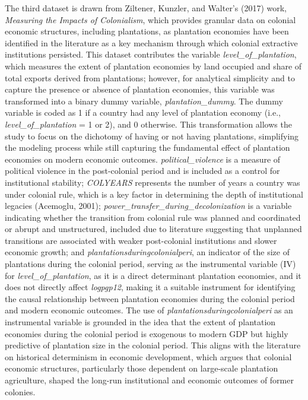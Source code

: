 \documentclass[12pt]{article}
\begin{document}
\vspace{0.2 in} 
\noindent The third dataset is drawn from Ziltener, Kunzler, and Walter’s (2017) work, \textit{Measuring the Impacts of Colonialism}, which provides granular data on colonial economic structures, including plantations, as plantation economies have been identified in the literature as a key mechanism through which colonial extractive institutions persisted. This dataset contributes the variable \textit{level\_of\_plantation}, which measures the extent of plantation economies by land occupied and share of total exports derived from plantations; however, for analytical simplicity and to capture the presence or absence of plantation economies, this variable was transformed into a binary dummy variable, \textit{plantation\_dummy}. The dummy variable is coded as 1 if a country had any level of plantation economy (i.e., \textit{level\_of\_plantation} = 1 or 2), and 0 otherwise. This transformation allows the study to focus on the dichotomy of having or not having plantations, simplifying the modeling process while still capturing the fundamental effect of plantation economies on modern economic outcomes. \textit{political\_violence} is a measure of political violence in the post-colonial period and is included as a control for institutional stability; \textit{COLYEARS} represents the number of years a country was under colonial rule, which is a key factor in determining the depth of institutional legacies (Acemoglu, 2001); \textit{power\_transfer\_during\_decolonization} is a variable indicating whether the transition from colonial rule was planned and coordinated or abrupt and unstructured, included due to literature suggesting that unplanned transitions are associated with weaker post-colonial institutions and slower economic growth; and \textit{plantationsduringcolonialperi}, an indicator of the size of plantations during the colonial period, serving as the instrumental variable (IV) for \textit{level\_of\_plantation}, as it is a direct determinant plantation economies, and it does not directly affect \textit{logpgp12}, making it a suitable instrument for identifying the causal relationship between plantation economies during the colonial period and modern economic outcomes.
The use of \textit{plantationsduringcolonialperi} as an instrumental variable is grounded in the idea that the extent of plantation economies during the colonial period is exogenous to modern GDP but highly predictive of plantation size in the colonial period. This aligns with the literature on historical determinism in economic development, which argues that colonial economic structures, particularly those dependent on large-scale plantation agriculture, shaped the long-run institutional and economic outcomes of former colonies.
\end{document}
